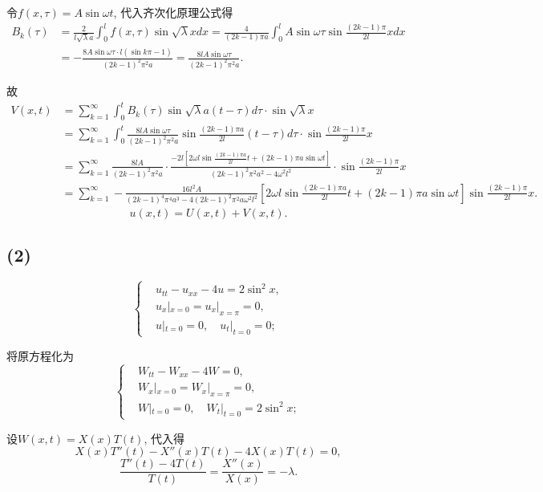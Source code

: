 \documentclass[11pt,a4paper]{article}
\begin{document}
令$f(x,\tau)=A\sin\omega t$, 代入齐次化原理公式得
\begin{align*}
  B_k(\tau)
   & =\frac{2}{l\sqrt{\lambda}a}\int_0^lf(x,\tau)\sin\sqrt{\lambda}xdx=\frac{4}{(2k-1)\pi a}\int_0^lA\sin\omega \tau\sin\frac{(2k-1)\pi}{2l}xdx \\
   & =-\frac{8A\sin\omega \tau\cdot l(\sin k\pi -1)}{(2k-1)^2\pi^2a}=\frac{8lA\sin\omega \tau}{(2k-1)^2\pi^2a}.
\end{align*}

故
\begin{align*}
  V(x,t) & =\sum_{k=1}^\infty\int_0^t B_k(\tau)\sin\sqrt{\lambda}a(t-\tau)d\tau\cdot\sin\sqrt{\lambda}x                                       \\
         & =\sum_{k=1}^\infty\int_0^t \frac{8lA\sin\omega \tau}{(2k-1)^2\pi^2a}\sin\frac{(2k-1)\pi a}{2l}(t-\tau)d\tau\cdot\sin\frac{(2k-1)\pi}{2l}x         \\
         & =\sum_{k=1}^\infty\frac{8lA}{(2k-1)^2\pi^2a}\cdot\frac{-2l[2\omega l\sin\frac{(2k-1)\pi a}{2l}t+(2k-1)\pi a\sin\omega t]}{(2k-1)^2\pi^2 a^2-4\omega^2l^2}\cdot\sin\frac{(2k-1)\pi}{2l}x \\
         & =\sum_{k=1}^\infty-\frac{16l^2A}{(2k-1)^4\pi^4a^3-4(2k-1)^2\pi^2a\omega^2l^2}\left[2\omega l\sin\frac{(2k-1)\pi a}{2l}t+(2k-1)\pi a\sin\omega t\right]\sin\frac{(2k-1)\pi}{2l}x.
\end{align*}
$$u(x,t)=U(x,t)+V(x,t).$$

\subsection*{(2)}

$$
  \left\{\begin{aligned}
     & u_{tt}-u_{xx}-4u=2\sin^2x,     \\
     & u_x|_{x=0}=u_x|_{x=\pi}=0,              \\
     & u|_{t=0}=0,\quad u_t|_{t=0}=0;
  \end{aligned}\right.
$$

将原方程化为
$$
  \left\{\begin{aligned}
     & W_{tt}-W_{xx}-4W=0,     \\
     & W_x|_{x=0}=W_x|_{x=\pi}=0,              \\
     & W|_{t=0}=0,\quad W_t|_{t=0}=2\sin^2x;
  \end{aligned}\right.
$$

设$W(x,t)=X(x)T(t)$, 代入得
$$X(x)T''(t)-X''(x)T(t)-4X(x)T(t)=0,$$
$$\frac{T''(t)-4T(t)}{T(t)}=\frac{X''(x)}{X(x)}=-\lambda.$$
\end{document}
